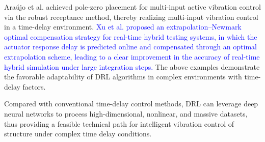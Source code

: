 \documentclass[review]{elsarticle}
\begin{document}
Ara\'{u}jo et al.
\citep{araujo_pole-zero_2025} achieved pole-zero placement for multi-input active vibration control via the robust receptance method, thereby realizing multi-input vibration control in a time-delay environment.
\textcolor{blue}{Xu et al. \citep{xu_extrapolation_2026} proposed an extrapolation--Newmark optimal compensation strategy for real-time hybrid testing systems, in which the actuator response delay is predicted online and compensated through an optimal extrapolation scheme, leading to a clear improvement in the accuracy of real-time hybrid simulation under large integration steps.}
The above examples demonstrate the favorable adaptability of DRL algorithms in complex environments with time-delay factors.

Compared with conventional time-delay control methods, DRL can leverage deep neural networks to process high-dimensional, nonlinear, and massive datasets, thus providing a feasible technical path for intelligent vibration control of structure under complex time delay conditions.
\end{document}
